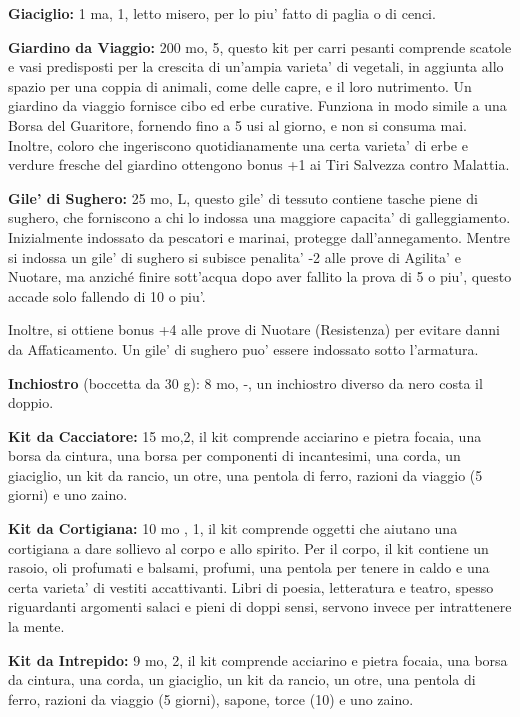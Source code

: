 \documentclass[a4paper,11pt,twoside,openany]{book}
\begin{document}
{\textbf{Giaciglio:} 1 ma, 1, letto misero, per lo piu' fatto di paglia o di cenci.

\textbf{Giardino da Viaggio:} 200 mo, 5, questo kit per carri pesanti comprende scatole e vasi predispo­sti per la crescita di un'ampia varieta' di vegetali, in aggiunta allo spazio per una coppia di animali, come delle capre, e il loro nutrimento. Un giardino da viaggio fornisce cibo ed erbe curative. Funziona in modo simile a una Borsa del Guaritore, fornendo fino a 5 usi al giorno, e non si consuma mai. Inoltre, coloro che ingeriscono quotidianamente una certa varieta' di ­erbe e verdure fresche del giardino ottengono bonus +1 ai Tiri Salvezza contro Malattia. 

\textbf{Gile' di Sughero:} 25 mo, L, questo gile' di tessuto contiene tasche piene di sughero, che forniscono a chi lo indossa una maggiore capacita' di galleggiamento. Inizialmente indossato da pescatori e marinai, protegge dall'annegamento. Mentre si indossa un gile' di sughero si subisce penalita' -2 alle prove di Agilita' e Nuotare, ma anziché finire sott'acqua dopo aver fallito la prova di 5 o piu', questo accade solo fallendo di 10 o piu'. 

Inoltre, si ottiene bonus +4 alle prove di Nuotare (Resistenza) per evitare danni da Affaticamento. Un gile' di sughero puo' essere indossato sotto l'armatura.

\textbf{Inchiostro} (boccetta da 30 g): 8 mo, -, un inchiostro diverso da nero costa il doppio.

\textbf{Kit da Cacciatore:} 15 mo,2, il kit comprende acciarino e pietra focaia, una borsa da cin­tura, una borsa per componenti di incantesimi, una corda, un giaciglio, un kit da rancio, un otre, una pentola di ferro, razioni da viaggio (5 giorni) e uno zaino.

\textbf{Kit da Cortigiana:} 10 mo , 1, il kit comprende oggetti che aiutano una cortigiana a dare sollievo al corpo e allo spirito. Per il corpo, il kit contiene un rasoio, oli profumati e balsami, profumi, una pentola per tenere in caldo e una certa varieta' di vestiti accattivanti. Libri di poesia, letteratura e teatro, spesso riguardanti argomenti salaci e pieni di doppi sensi, servono invece per intrattenere la mente.

\textbf{Kit da Intrepido:} 9 mo, 2, il kit comprende acciarino e pietra focaia, una borsa da cin­tura, una corda, un giaciglio, un kit da rancio, un otre, una pentola di ferro, razioni da viaggio (5 giorni), sapone, torce (10) e uno zaino.

}
\end{document}

